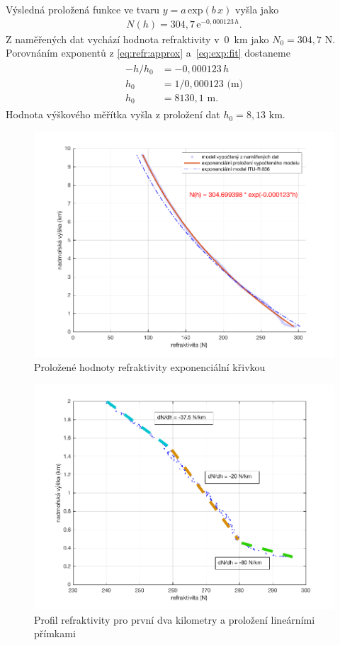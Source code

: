 \documentclass[twoside]{ctuthesis}
\newcommand{\mt}[1]{\text{#1}}
\theoremstyle{plain}
\theoremstyle{definition}
\theoremstyle{note}
\begin{document}
	Výsledná proložená funkce ve tvaru $y=a\,\mt{exp}(b\,x)$ vyšla jako
	\begin{align}
		N(h) = 304{,}7\,\mt{e}^{-0{,}000123\,h}.
		\label{eq:exp:fit}
	\end{align}
	Z naměřených dat vychází hodnota refraktivity v~0~km jako $N_\mt{0} = 304{,}7 \mt{ N}$. Porovnáním exponentů z \eqref{eq:refr:approx} a~\eqref{eq:exp:fit} dostaneme
	\begin{align}
		\begin{split}
		-h/h_\mt{0} &= -0{,}000123\,h\\
		h_\mt{0} &= 1/0{,}000123 \mt{ (m)}\\
		h_\mt{0} &= 8130{,}1 \mt{ m}.
		\end{split}
	\end{align}
	Hodnota výškového měřítka vyšla z proložení dat $h_\mt{0} = 8{,}13 \mt{ km}$.
	\begin{figure}[hbtp]
		\centering
		\includegraphics[width=.7\textwidth]{Graphs/refractivity_meas_fit_model.pdf}
		\caption{Proložené hodnoty refraktivity exponenciální křivkou}
		\label{graph:refr:fit}
	\end{figure}

	\begin{figure}
		\centering
		\includegraphics[width=.7\textwidth]{Graphs/N_gradient.pdf}
		\caption{Profil refraktivity pro první dva kilometry a proložení lineárními přímkami}
		\label{graf:refr:2km}
	\end{figure}
\end{document}
